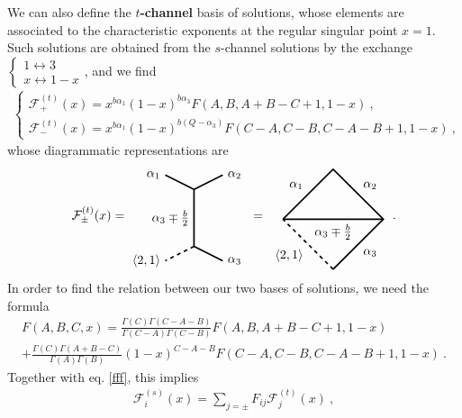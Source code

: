 \documentclass[12pt, a4paper, notitlepage, twoside]{report}
\numberwithin{equation}{section}
\theoremstyle{break}
\begin{document}
We can also define the \textbf{\boldmath $t$-channel} basis of solutions, whose elements are associated to the characteristic exponents at the regular singular point $x=1$.
Such solutions are obtained from the $s$-channel solutions by the exchange $\left\{\begin{smallmatrix} 1\leftrightarrow 3\\ x\leftrightarrow 1-x \end{smallmatrix}\right.$, and we find 
\begin{align}
 \left\{\begin{array}{l}  \mathcal{F}^{(t)}_+(x) = x^{b\alpha_1} (1-x)^{b\alpha_3} F(A,B,A+B-C+1,1-x) \ ,
\\ \mathcal{F}^{(t)}_-(x) =x^{b\alpha_1} (1-x)^{b(Q-\alpha_3)} F(C-A,C-B,C-A-B+1,1-x)\ ,
\end{array}\right.  
\end{align}
whose diagrammatic representations are 
\begin{align}
 \mathcal{F}^{(t)}_\pm(x)  =  
 \begin{tikzpicture}[baseline=(current  bounding  box.center), very thick, scale = .4]
 \draw (-2,3) node [left] {$\alpha_1$} -- (0,2) -- node [left] {$\alpha_3\mp \frac{b}{2}$} (0,-2);
 \draw[dashed] (0, -2) -- (-2, -3) node [left] {$\langle 2,1 \rangle$};
\draw (0,2) -- (2,3) node [right] {$\alpha_2$};
\draw (0,-2) -- (2, -3) node [right] {$\alpha_3$};
\end{tikzpicture}
\ =\
\begin{tikzpicture}[baseline=(current  bounding  box.center), very thick, scale = .7]
\draw (-2, 0) -- node [above left] {$\alpha_1$} (0, 2) -- node [above right] {$\alpha_2$} (2, 0) -- node [below right] {$\alpha_3$} (0, -2);
\draw[dashed] (0, -2) -- node [below left] {$\langle 2,1 \rangle$} (-2, 0);
\draw (-2, 0) -- node [below] {$\alpha_3\mp \frac{b}{2}$} (2, 0); 
\end{tikzpicture}
\ \ .
\label{tpic}
\end{align}
In order to find the relation between our two bases of solutions, we need the formula
\begin{multline}
 F(A,B,C,x) = \frac{\Gamma(C)\Gamma(C-A-B)}{\Gamma(C-A)\Gamma(C-B)} F(A,B,A+B-C+1,1-x) 
\\
 + \frac{\Gamma(C)\Gamma(A+B-C)}{\Gamma(A)\Gamma(B)} (1-x)^{C-A-B}F(C-A,C-B,C-A-B+1,1-x)\ .
\end{multline}
Together with eq. \eqref{fff}, this implies 
\begin{align}
 \mathcal{F}^{(s)}_i(x) = \sum_{j=\pm} F_{ij} \mathcal{F}^{(t)}_j(x)\ ,
\label{gfg}
\end{align}
\end{document}
